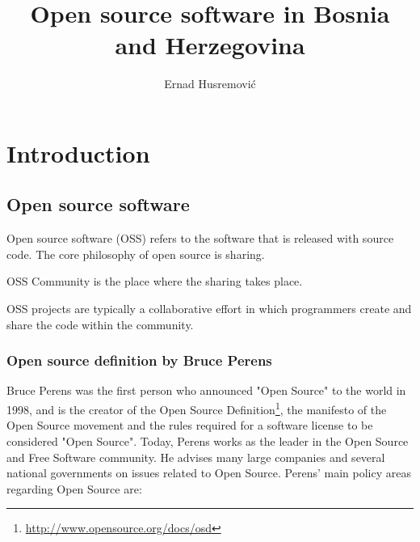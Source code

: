 \documentclass[times, utf8, seminar]{fit}
\begin{document}
\title{Open source software in Bosnia and Herzegovina}

\author{Ernad Husremović}


\maketitle

\tableofcontents

\newpage

%
%


\chapter{Introduction}

\section{Open source software}

Open source software (OSS) refers to the software that is released with source code. The core philosophy of open source is sharing.

OSS Community is the place where the sharing takes place.

OSS projects are typically a collaborative effort in which programmers create and share the code within the community.

\subsection{Open source definition by Bruce Perens}
Bruce Perens was the first person who announced "Open Source" to the world in 1998, and is the creator of the Open Source Definition\footnote{\url{http://www.opensource.org/docs/osd}}, the manifesto of the Open Source movement and the rules required for a software license to be considered "Open Source"\citep{web:perens}. Today, Perens works as the leader in the Open Source and Free Software community. He advises many large companies and several national governments on issues related to Open Source. Perens' main policy areas regarding Open Source are:
\end{document}
